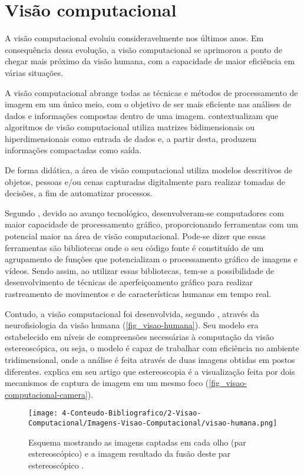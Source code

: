 \section{\textbf{{Visão computacional}}}
\label{visao-computacional}

A visão computacional evoluiu consideravelmente nos últimos anos. Em consequência dessa evolução, a visão computacional se aprimorou a ponto de chegar mais próximo da visão humana, com a capacidade de maior eficiência em várias situações.

A visão computacional abrange todas as técnicas e métodos de processamento de imagem em um único meio, com o objetivo de ser mais eficiente nas análises de dados e informações compostas dentro de uma imagem.  contextualizam que algoritmos de visão computacional utiliza matrizes bidimensionais ou hiperdimensionais como entrada de dados e, a partir desta, produzem informações compactadas como saída.

De forma didática, a área de visão computacional utiliza modelos descritivos de objetos, pessoas e/ou cenas capturadas digitalmente para realizar tomadas de decisões, a fim de automatizar processos.

Segundo , devido ao avanço tecnológico, desenvolveram-se computadores com maior capacidade de processamento gráfico, proporcionando ferramentas com um potencial maior na área de visão computacional. Pode-se dizer que essas ferramentas são bibliotecas onde o seu código fonte é constituído de um agrupamento de funções que potencializam o processamento gráfico de imagens e vídeos. Sendo assim, ao utilizar essas bibliotecas, tem-se a possibilidade de desenvolvimento de técnicas de aperfeiçoamento gráfico para realizar rastreamento de movimentos e de características humanas em tempo real.

Contudo, a visão computacional foi desenvolvida, segundo , através da neurofisiologia da visão humana (\autoref{fig_visao-humana}). Seu modelo era estabelecido em níveis de compreensões necessárias à computação da visão estereoscópica, ou seja, o modelo é capaz de trabalhar com eficiência no ambiente tridimensional, onde a análise é feita através de duas imagens obtidas em postos diferentes.  explica em seu artigo que estereoscopia é a visualização feita por dois mecanismos de captura de imagem em um mesmo foco (\autoref{fig_visao-computacional-camera}).

\begin{figure}[h]
	\caption{\label{fig_visao-humana}Esquema mostrando as imagens captadas em cada olho (par estereoscópico) e a imagem resultado da fusão deste par estereoscópico \cite{PERONTI2008}.}
	\begin{center}
		\texttt{[image: 4-Conteudo-Bibliografico/2-Visao-Computacional/Imagens-Visao-Computacional/visao-humana.png]}
	\end{center}
	\centering {}
\end{figure}

